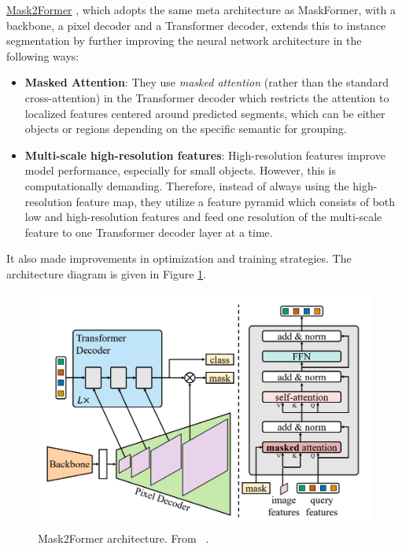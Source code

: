 \underline{Mask2Former} \cite{cheng2022maskedattentionmasktransformeruniversal}, which adopts the
same meta architecture as MaskFormer, with a backbone, a pixel decoder and a Transformer decoder, extends this to instance segmentation by further improving the neural network architecture in the following ways:
\begin{itemize}
    \item \textbf{Masked Attention}: They use \textit{masked attention} (rather than the standard cross-attention) in the Transformer decoder which restricts the attention to localized features centered around predicted segments, which can be either objects or regions depending on the specific semantic for grouping.
    \item \textbf{Multi-scale high-resolution features}: High-resolution features improve model performance, especially for small objects. However, this is computationally demanding. Therefore, instead of always using the high-resolution feature map, they utilize a feature pyramid which consists of both low and high-resolution features and feed one resolution of the multi-scale feature to one Transformer decoder layer at a time.
\end{itemize}
It also made improvements in optimization and training strategies. The architecture diagram is given in Figure \ref{fig:mask2former}.

\begin{figure}[t]
    \centering
     \includegraphics[width=0.8\linewidth]{images/mask2former_arch.png}
  
     \caption{Mask2Former architecture. From ~\cite{cheng2022maskedattentionmasktransformeruniversal}.}
     \label{fig:mask2former}
\end{figure}